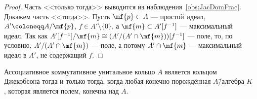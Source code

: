 \documentclass[
	extrafontsizes,
	11pt,
	hyphens,
]{memoir}
\begin{document}
\begin{proof}
Часть <<только тогда>> выводится из наблюдения~\ref{obs:JacDomFrac}.
Докажем часть <<тогда>>.
Пусть \(\mf{p} \subset A\) --- простой идеал, \(A' \coloneqq A / \mf{p}\), \(f \in A' \setminus \{0\}\), а \(\mf{m} \subset A'[f^{-1}]\) --- максимальный идеал.
Так как \(A'[f^{-1}] / \mf{m} \cong (A' / (A' \cap \mf{m}))[f^{-1}]\) --- поле, то, по условию, \(A' / (A' \cap \mf{m})\) --- поле, а потому \(A' \cap \mf{m}\) --- максимальный идеал в \(A'\), не содержащий \(f\).
\end{proof}





\begin{theorem}
Ассоциативное коммутативное унитальное кольцо \(A\) является кольцом Джекобсона\label{thm:GenZarLemma} тогда и только тогда, когда любая конечно порождённая \(A\)\=/алгебра \(K\), которая является полем, конечна над \(A\).
\end{theorem}
\end{document}

